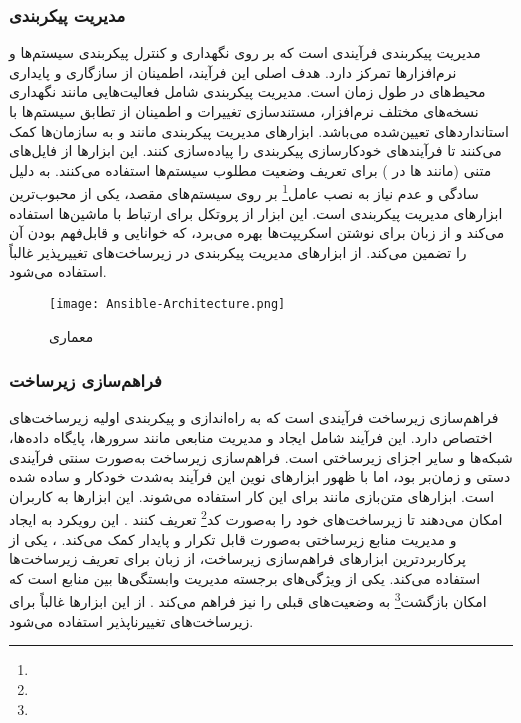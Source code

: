 \subsubsection{مدیریت پیکربندی}
مدیریت پیکربندی فرآیندی است که بر روی نگهداری و کنترل پیکربندی سیستم‌ها و نرم‌افزارها تمرکز دارد. هدف اصلی این فرآیند، اطمینان از سازگاری و پایداری محیط‌های  در طول زمان است. مدیریت پیکربندی شامل فعالیت‌هایی مانند نگهداری نسخه‌های مختلف نرم‌افزار، مستندسازی تغییرات و اطمینان از تطابق سیستم‌ها با استانداردهای تعیین‌شده می‌باشد. ابزارهای مدیریت پیکربندی مانند  و  به سازمان‌ها کمک می‌کنند تا فرآیندهای خودکارسازی پیکربندی را پیاده‌سازی کنند. این ابزارها از فایل‌های متنی (مانند ها در ) برای تعریف وضعیت مطلوب سیستم‌ها استفاده می‌کنند.  \cite{Ansible} به دلیل سادگی و عدم نیاز به نصب عامل\footnote{} بر روی سیستم‌های مقصد، یکی از محبوب‌ترین ابزارهای مدیریت پیکربندی است. این ابزار از پروتکل  برای ارتباط با ماشین‌ها استفاده می‌کند و از زبان  برای نوشتن اسکریپت‌ها بهره می‌برد، که خوانایی و قابل‌فهم بودن آن را تضمین می‌کند. از ابزارهای مدیریت پیکربندی در زیرساخت‌های تغییرپذیر غالباً استفاده می‌شود.


\begin{figure}[!t]
	\centering
	\texttt{[image: Ansible-Architecture.png]}
	\caption{معماری }
	\label{fig: ansible arch}
\end{figure}


\subsubsection{فراهم‌سازی زیرساخت}
فراهم‌سازی زیرساخت فرآیندی است که به راه‌اندازی و پیکربندی اولیه زیرساخت‌های  اختصاص دارد. این فرآیند شامل ایجاد و مدیریت منابعی مانند سرورها، پایگاه داده‌ها، شبکه‌ها و سایر اجزای زیرساختی است. فراهم‌سازی زیرساخت به‌صورت سنتی فرآیندی دستی و زمان‌بر بود، اما با ظهور ابزارهای نوین این فرآیند به‌شدت خودکار و ساده شده است. ابزارهای متن‌بازی مانند  برای این کار استفاده می‌شوند. این ابزارها به کاربران امکان می‌دهند تا زیرساخت‌های خود را به‌صورت کد\footnote{} تعریف کنند \cite{DevopsIaac1}. این رویکرد به ایجاد و مدیریت منابع زیرساختی به‌صورت قابل تکرار و پایدار کمک می‌کند. ، یکی از پرکاربردترین ابزارهای فراهم‌سازی زیرساخت، از زبان  برای تعریف زیرساخت‌ها استفاده می‌کند. یکی از ویژگی‌های برجسته  مدیریت وابستگی‌ها بین منابع است که امکان بازگشت\footnote{} به وضعیت‌های قبلی را نیز فراهم می‌کند \cite{Terraform}. از این ابزارها غالباً برای زیرساخت‌های تغییرناپذیر استفاده می‌شود.

